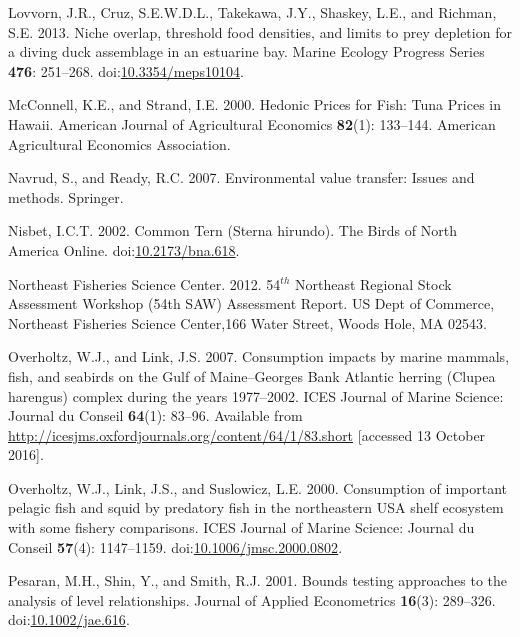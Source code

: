 \documentclass[]{article}
\begin{document}
\hypertarget{ref-lovvorn_niche_2013}{}
Lovvorn, J.R., Cruz, S.E.W.D.L., Takekawa, J.Y., Shaskey, L.E., and
Richman, S.E. 2013. Niche overlap, threshold food densities, and limits
to prey depletion for a diving duck assemblage in an estuarine bay.
Marine Ecology Progress Series \textbf{476}: 251--268.
doi:\href{https://doi.org/10.3354/meps10104}{10.3354/meps10104}.

\hypertarget{ref-McConnell2000HedonicHawaii}{}
McConnell, K.E., and Strand, I.E. 2000. Hedonic Prices for Fish: Tuna
Prices in Hawaii. American Journal of Agricultural Economics
\textbf{82}(1): 133--144. American Agricultural Economics Association.

\hypertarget{ref-navrud2007environmental}{}
Navrud, S., and Ready, R.C. 2007. Environmental value transfer: Issues
and methods. Springer.

\hypertarget{ref-nisbet_common_2002}{}
Nisbet, I.C.T. 2002. Common Tern (Sterna hirundo). The Birds of North
America Online.
doi:\href{https://doi.org/10.2173/bna.618}{10.2173/bna.618}.

\hypertarget{ref-NEFSC2012Assessment}{}
Northeast Fisheries Science Center. 2012. 54\(^{th}\) Northeast Regional
Stock Assessment Workshop (54th SAW) Assessment Report. US Dept of
Commerce, Northeast Fisheries Science Center,166 Water Street, Woods
Hole, MA 02543.

\hypertarget{ref-overholtz_consumption_2007}{}
Overholtz, W.J., and Link, J.S. 2007. Consumption impacts by marine
mammals, fish, and seabirds on the Gulf of Maine--Georges Bank Atlantic
herring (Clupea harengus) complex during the years 1977--2002. ICES
Journal of Marine Science: Journal du Conseil \textbf{64}(1): 83--96.
Available from
\url{http://icesjms.oxfordjournals.org/content/64/1/83.short}
{[}accessed 13 October 2016{]}.

\hypertarget{ref-overholtz_consumption_2000}{}
Overholtz, W.J., Link, J.S., and Suslowicz, L.E. 2000. Consumption of
important pelagic fish and squid by predatory fish in the northeastern
USA shelf ecosystem with some fishery comparisons. ICES Journal of
Marine Science: Journal du Conseil \textbf{57}(4): 1147--1159.
doi:\href{https://doi.org/10.1006/jmsc.2000.0802}{10.1006/jmsc.2000.0802}.

\hypertarget{ref-Pesaran2001BoundsRelationships}{}
Pesaran, M.H., Shin, Y., and Smith, R.J. 2001. Bounds testing approaches
to the analysis of level relationships. Journal of Applied Econometrics
\textbf{16}(3): 289--326.
doi:\href{https://doi.org/10.1002/jae.616}{10.1002/jae.616}.
\end{document}
